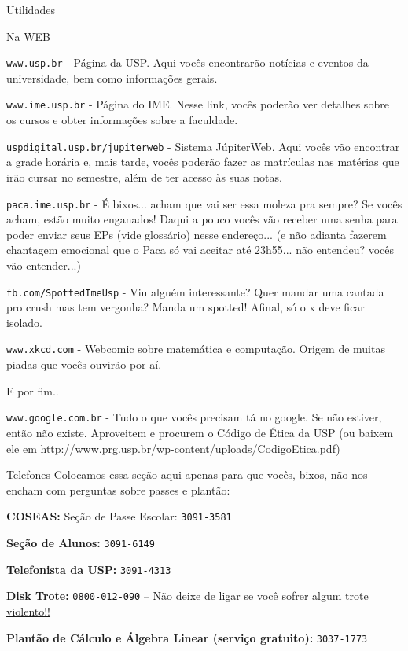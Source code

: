 \begin{secao}{Utilidades}

\begin{subsecao}{Na WEB}

{\tt www.usp.br} - Página da USP. Aqui vocês encontrarão notícias e eventos da
universidade, bem como informações gerais.

{\tt www.ime.usp.br} - Página do IME.
Nesse link, vocês poderão ver detalhes sobre os cursos e obter informações sobre
a faculdade.

{\tt uspdigital.usp.br/jupiterweb} - Sistema JúpiterWeb. Aqui vocês vão
encontrar a grade horária e, mais tarde, vocês poderão fazer as matrículas nas
matérias que irão cursar no semestre, além de ter acesso às suas notas.

{\tt paca.ime.usp.br} - É bixos... acham que vai ser essa moleza pra sempre? Se
vocês acham, estão muito enganados! Daqui a pouco vocês vão receber uma senha para
poder enviar seus EPs (vide glossário) nesse endereço... (e não adianta fazerem
chantagem emocional que o Paca só vai aceitar até 23h55... não entendeu? vocês
vão entender...)

{\tt fb.com/SpottedImeUsp} - Viu alguém interessante? Quer mandar uma cantada 
pro crush mas tem vergonha? Manda um spotted! Afinal, só o x deve ficar isolado.

{\tt www.xkcd.com} - Webcomic sobre matemática e computação. Origem de muitas
piadas que vocês ouvirão por aí.

E por fim..

{\tt www.google.com.br} - Tudo o que vocês precisam tá no google. Se não estiver,
então não existe. Aproveitem e procurem o Código de Ética da USP (ou baixem ele em
\url{http://www.prg.usp.br/wp-content/uploads/CodigoEtica.pdf})

\end{subsecao}

\begin{subsecao}{Telefones}
Colocamos essa seção aqui apenas para que vocês, bixos, não nos encham com perguntas
sobre passes e plantão:

{\bf COSEAS:} Seção de Passe Escolar: {\tt 3091-3581}

{\bf Seção de Alunos:} {\tt 3091-6149}

{\bf Telefonista da USP:} {\tt 3091-4313}

{\bf Disk Trote:} {\tt 0800-012-090} -- \underline{Não deixe de ligar se você sofrer algum trote violento!!}

{\bf Plantão de Cálculo e Álgebra Linear (serviço gratuito):} {\tt 3037-1773}

\end{subsecao}
\end{secao}
